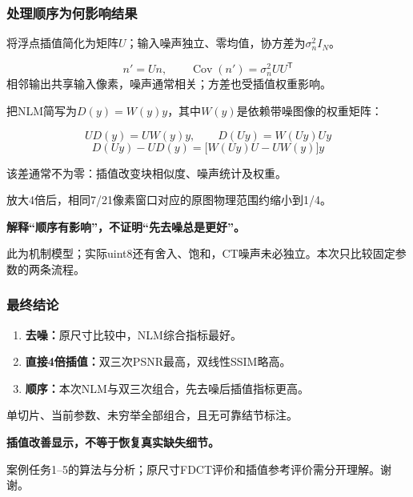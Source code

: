 \documentclass[11pt,aspectratio=169]{beamer}
\newcommand{\key}[1]{{\color{Accent}\bfseries #1}}
\newcommand{\source}[1]{\vfill{\fontsize{7.5}{9}\selectfont\color{Muted}#1\par}}
\begin{document}
\begin{frame}
\frametitle{处理顺序为何影响结果}
{\small 将浮点插值简化为矩阵$U$；输入噪声独立、零均值，协方差为$\sigma_n^2 I_N$。}\par
\[
n'=Un,\qquad \operatorname{Cov}(n')=\sigma_n^2 UU^{\mathsf T}
\]
{\small 相邻输出共享输入像素，噪声通常相关；方差也受插值权重影响。}\par
\vspace{2mm}
{\small 把NLM简写为$D(y)=W(y)y$，其中$W(y)$是依赖带噪图像的权重矩阵：}\par
\[
U D(y)=U W(y)y,\qquad D(Uy)=W(Uy)Uy
\]
\[
D(Uy)-U D(y)=\bigl[W(Uy)U-UW(y)\bigr]y
\]
{\small 该差通常不为零：插值改变块相似度、噪声统计及权重。\par
放大4倍后，相同7/21像素窗口对应的原图物理范围约缩小到1/4。}\par
\vspace{2mm}
\key{解释“顺序有影响”，不证明“先去噪总是更好”。}
\source{此为机制模型；实际uint8还有舍入、饱和，CT噪声未必独立。本次只比较固定参数的两条流程。}
\end{frame}

\begin{frame}
\frametitle{最终结论}
\begin{enumerate}
\item \textbf{去噪：}原尺寸比较中，NLM综合指标最好。
\vspace{3mm}
\item \textbf{直接4倍插值：}双三次PSNR最高，双线性SSIM略高。
\vspace{3mm}
\item \textbf{顺序：}本次NLM与双三次组合，先去噪后插值指标更高。
\end{enumerate}
\vspace{3mm}
{\small 单切片、当前参数、未穷举全部组合，且无可靠结节标注。}\par
\vspace{3mm}
\key{插值改善显示，不等于恢复真实缺失细节。}
\source{案例任务1--5的算法与分析；原尺寸FDCT评价和插值参考评价需分开理解。谢谢。}
\end{frame}
\end{document}
